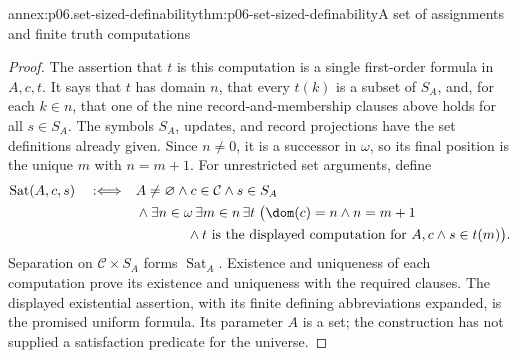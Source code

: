 \begin{annexitem}{annex:p06.set-sized-definability}{thm:p06-set-sized-definability}{A set of assignments and finite truth computations}
\begin{proof}
The assertion that \(t\) is this computation is a single
first-order formula in \(A,c,t\).  It says that \(t\) has domain
\(n\), that every \(t(k)\) is a subset of \(S_A\), and, for
each \(k\in n\), that one of the nine record-and-membership
clauses above holds for all \(s\in S_A\).  The symbols \(S_A\),
updates, and record projections have the set definitions already
given.  Since \(n\ne0\), it is a successor in \(\omega\), so
its final position is the unique \(m\) with \(n=m+1\).
For unrestricted set arguments, define
\[
\begin{aligned}
 \operatorname{Sat}(A,c,s)
 \quad:\Longleftrightarrow\quad
 &A\ne\varnothing\land c\in\mathcal C\land s\in S_A\\
 &{}\land\exists n\in\omega\,\exists m\in n\,\exists t\;
 \bigl(\dom(c)=n\land n=m+1\\
 &\hspace{13mm}\land
 t\text{ is the displayed computation for }A,c
                  \land s\in t(m)\bigr).
\end{aligned}
\]
Separation on \(\mathcal C\times S_A\) forms
\(\operatorname{Sat}_A\).  Existence and uniqueness of each
computation prove its existence and uniqueness with the required
clauses.  The displayed existential assertion, with its finite
defining abbreviations expanded, is the promised uniform formula.
Its parameter \(A\) is a set; the construction has not supplied
a satisfaction predicate for the universe.


\end{proof}
\end{annexitem}

